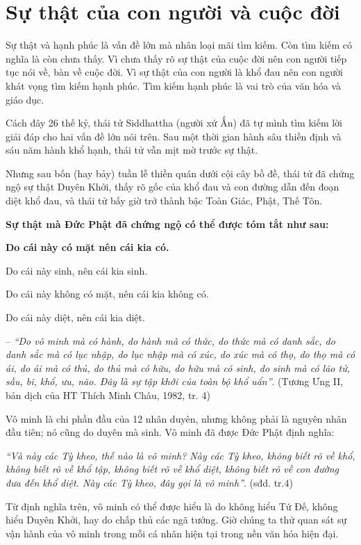 \chapter{Sự thật của con người và cuộc đời} %
\label{cha:su_that_cua_con_nguoi_va_cuoc_doi}

Sự thật và hạnh phúc là vấn đề lớn mà nhân loại mãi tìm kiếm. Còn tìm kiếm có nghĩa là còn chưa thấy. Vì chưa thấy rõ sự thật của cuộc đời nên con người tiếp tục nói về, bàn về cuộc đời. Vì sự thật của con người là khổ đau nên con người khát vọng tìm kiếm hạnh phúc. Tìm kiếm hạnh phúc là vai trò của văn hóa và giáo dục.

Cách đây 26 thế kỷ, thái tử Siddhattha (người xứ Ấn) đã tự mình tìm kiếm lời giải đáp cho hai vấn đề lớn nói trên. Sau một thời gian hành sâu thiền định và sáu năm hành khổ hạnh, thái tử vẫn mịt mờ trước sự thật.

Nhưng sau bốn (hay bảy) tuần lễ thiền quán dưới cội cây bồ đề, thái tử đã chứng ngộ sự thật Duyên Khởi, thấy rõ gốc của khổ đau và con đường dẫn đến đoạn diệt khổ đau, và thái tử bấy giờ trở thành bậc Toàn Giác, Phật, Thế Tôn.

\hrulefill

{\bf Sự thật mà Đức Phật đã chứng ngộ có thể được tóm tắt như sau:}


{\bf Do cái này có mặt nên cái kia có.

Do cái này sinh, nên cái kia sinh.

Do cái này không có mặt, nên cái kia không có.

Do cái này diệt, nên cái kia diệt.}

-- \emph{``Do vô minh mà có hành, do hành mà có thức, do thức mà có danh sắc, do danh sắc mà có lục nhập, do lục nhập mà có xúc, do xúc mà có thọ, do thọ mà có ái, do ái mà có thủ, do thủ mà có hữu, do hữu mà có sinh, do sinh mà có lão tử, sầu, bi, khổ, ưu, não. Đây là sự tập khởi của toàn bộ khổ uẩn''}. (Tương Ưng II, bản dịch của HT Thích Minh Châu, 1982, tr. 4)

\hrulefill

Vô minh là chi phần đầu của 12 nhân duyên, nhưng không phải là nguyên nhân đầu tiên; nó cũng do duyên mà sinh. Vô minh đã được Đức Phật định nghĩa:

\emph{``Và này các Tỳ kheo, thế nào là vô minh? Này các Tỳ kheo, không biết rõ về khổ, không biết rõ về khổ tập, không biết rõ về khổ diệt, không biết rõ về con đường đưa đến khổ diệt. Này các Tỳ kheo, đây gọi là vô minh''}. (sđd. tr.4)

Từ định nghĩa trên, vô minh có thể được hiểu là do không hiểu Tứ Đế, không hiểu Duyên Khởi, hay do chấp thủ các ngã tướng. Giờ chúng ta thử quan sát sự vận hành của vô minh trong mỗi cá nhân hiện tại trong nền văn hóa hiện đại.

